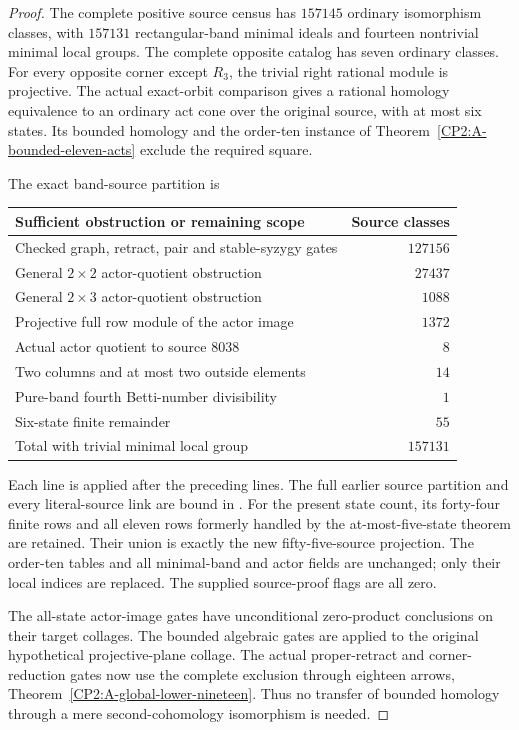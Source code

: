 \begin{proof}
The complete positive source census has $157145$ ordinary
isomorphism classes, with $157131$ rectangular-band minimal
ideals and fourteen nontrivial minimal local groups.
The complete opposite catalog has seven ordinary classes.
For every opposite corner except $R_3$, the trivial right
rational module is projective.  The actual exact-orbit comparison
gives a rational homology equivalence to an ordinary act cone
over the original source, with at most six states.  Its bounded
homology and the order-ten instance of
Theorem~\ref{CP2:A-bounded-eleven-acts} exclude the required square.

The exact band-source partition is
\begin{center}
\begin{tabular}{lr}
\hline
Sufficient obstruction or remaining scope & Source classes\\
\hline
Checked graph, retract, pair and stable-syzygy gates & $127156$\\
General $2\times2$ actor-quotient obstruction & $27437$\\
General $2\times3$ actor-quotient obstruction & $1088$\\
Projective full row module of the actor image & $1372$\\
Actual actor quotient to source $8038$ & $8$\\
Two columns and at most two outside elements & $14$\\
Pure-band fourth Betti-number divisibility & $1$\\
Six-state finite remainder & $55$\\
\hline
Total with trivial minimal local group & $157131$\\
\hline
\end{tabular}
\end{center}
Each line is applied after the preceding lines.  The full earlier
source partition and every literal-source link are bound in
.
For the present state count, its forty-four finite rows and all
eleven rows formerly handled by the at-most-five-state theorem
are retained.  Their union is exactly the new fifty-five-source
projection.  The order-ten tables and all minimal-band and actor
fields are unchanged; only their local indices are replaced.
The supplied source-proof flags are all zero.

The all-state actor-image gates have unconditional zero-product
conclusions on their target collages.  The bounded algebraic gates
are applied to the original hypothetical projective-plane collage.
The actual proper-retract and corner-reduction gates now use the
complete exclusion through eighteen arrows,
Theorem~\ref{CP2:A-global-lower-nineteen}.
Thus no transfer of bounded homology through a mere
second-cohomology isomorphism is needed.


\end{proof}
